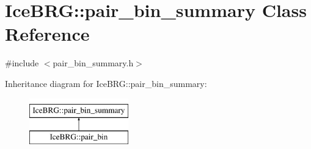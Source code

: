 \hypertarget{classIceBRG_1_1pair__bin__summary}{\section{Ice\-B\-R\-G\-:\-:pair\-\_\-bin\-\_\-summary Class Reference}
\label{classIceBRG_1_1pair__bin__summary}
}


{\ttfamily \#include $<$pair\-\_\-bin\-\_\-summary.\-h$>$}

Inheritance diagram for Ice\-B\-R\-G\-:\-:pair\-\_\-bin\-\_\-summary\-:\begin{figure}[H]
\begin{center}
\leavevmode
\includegraphics[height=2.000000cm]{classIceBRG_1_1pair__bin__summary}
\end{center}
\end{figure}
